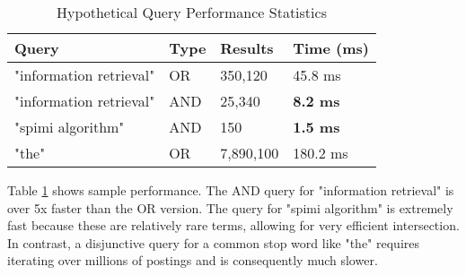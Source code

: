 \documentclass{article}
\begin{document}
\begin{table}[h!]
\centering
\caption{Hypothetical Query Performance Statistics}
\begin{tabular}{|l|l|l|l|}
\hline
\textbf{Query} & \textbf{Type} & \textbf{Results} & \textbf{Time (ms)} \\ \hline
"information retrieval" & OR & 350,120 & 45.8 ms \\ \hline
"information retrieval" & AND & 25,340 & \textbf{8.2 ms} \\ \hline
"spimi algorithm" & AND & 150 & \textbf{1.5 ms} \\ \hline
"the" & OR & 7,890,100 & 180.2 ms \\ \hline
\end{tabular}
\label{tab:query_perf}
\end{table}

Table \ref{tab:query_perf} shows sample performance. The AND query for "information retrieval" is over 5x faster than the OR version. The query for "spimi algorithm" is extremely fast because these are relatively rare terms, allowing for very efficient intersection. In contrast, a disjunctive query for a common stop word like "the" requires iterating over millions of postings and is consequently much slower.
\end{document}
